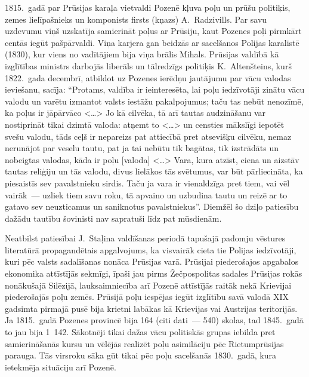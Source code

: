 \documentclass[twoside,a5paper,12pt,fleqn,openany]{extbook}
\newcommand{\citespace}{<\dots{}>}
\begin{document}
1815.~gadā par Prūsijas karaļa vietvaldi Pozenē kļuva poļu un prūšu politiķis, zemes lielīpašnieks un komponists firsts (kņazs) A.~Radzivills. Par savu uzdevumu viņš uzskatīja samierināt poļus ar Prūsiju, kaut Pozenes poļi pirmkārt centās iegūt pašpārvaldi. Viņa karjera gan beidzās ar sacelšanos Polijas karalistē (1830), kur viens no vadītājiem bija viņa brālis Mihals. Prūsijas valdībā kā izglītības ministrs darbojās liberāls un tālredzīgs politiķis K.~Altenšteins, kurš 1822.~gada decembrī, atbildot uz Pozenes ierēdņu jautājumu par vācu valodas ieviešanu, sacīja: ``Protams, valdība ir ieinteresēta, lai poļu iedzīvotāji zinātu vācu valodu un varētu izmantot valsts iestāžu pakalpojumus; taču tas nebūt nenozīmē, ka poļus ir jāpārvāco \citespace{} Jo kā cilvēka, tā arī tautas audzināšanu var nostiprināt tikai dzimtā valoda: atņemt to \citespace{} un censties mākslīgi iepotēt svešu valodu, tāds ceļš ir nepareizs pat attiecībā pret atsevišķu cilvēku, nemaz nerunājot par veselu tautu, pat ja tai nebūtu tik bagātas, tik izstrādāts un nobeigtas valodas, kāda ir poļu [valoda] \citespace{} Vara, kura atzīst, ciena un aizstāv tautas reliģiju un tās valodu, divus lielākos tās svētumus, var būt pārliecināta, ka piesaistīs sev pavalstnieku sirdis. Taču ja vara ir vienaldzīga pret tiem, vai vēl vairāk~--- uzliek tiem savu roku, tā apvaino un uzbudina tautu un reizē ar to gatavo sev neuzticamus un saniknotus pavalstniekus''. Diemžēl šo dziļo patiesību dažādu tautību šovinisti nav sapratuši līdz pat mūsdienām.

Neatbilst patiesībai J.~Staļina valdīšanas periodā tapušajā padomju vēstures literatūrā propagandētais apgalvojums, ka visvairāk cieta tie Polijas iedzīvotāji, kuri pēc valsts sadalīšanas nonāca Prūsijas varā. Prūsijai piederošajos apgabalos ekonomika attīstījās sekmīgi, īpaši jau pirms Žečpospolitas sadales Prūsijas rokās nonākušajā Silēzijā, lauksaimniecība arī Pozenē attīstījās raitāk nekā Krievijai piederošajās poļu zemēs. Prūsijā poļu iespējas iegūt izglītību savā valodā XIX gadsimta pirmajā pusē bija krietni labākas kā Krievijas vai Austrijas teritorijās. Ja 1815.~gadā Pozenes provincē bija 164 (citi dati~--- 540) skolas, tad 1845.~gadā to jau bija 1~142. Sākotnēji tikai dažas vācu politiskās grupas iebilda pret samierināšanās kursu un vēlējās realizēt poļu asimilāciju pēc Rietumprūsijas parauga. Tās virsroku sāka gūt tikai pēc poļu sacelšanās 1830.~gadā, kura ietekmēja situāciju arī Pozenē.
\end{document}
